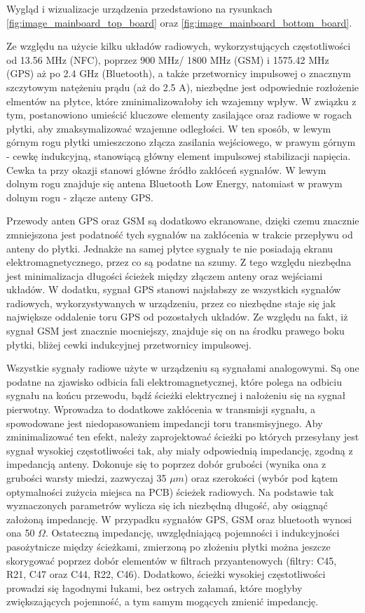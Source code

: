 Wygląd i wizualizacje urządzenia przedstawiono na rysunkach \ref{fig:image_mainboard_top_board} oraz \ref{fig:image_mainboard_bottom_board}.

Ze względu na użycie kilku układów radiowych, wykorzystujących częstotliwości od 13.56 MHz (NFC), poprzez 900 MHz/ 1800 MHz (GSM) i 1575.42 MHz (GPS) aż po 2.4 GHz (Bluetooth), a także przetwornicy impulsowej o znacznym szczytowym natężeniu prądu (aż do 2.5 A), niezbędne jest odpowiednie rozłożenie elmentów na płytce, które zminimalizowałoby ich wzajemny wpływ. W związku z tym, postanowiono umieścić kluczowe elementy zasilające oraz radiowe w rogach płytki, aby zmaksymalizować wzajemne odległości. W ten sposób, w lewym górnym rogu płytki umieszczono złącza zasilania wejściowego, w prawym górnym - cewkę indukcyjną, stanowiącą główny element impulsowej stabilizacji napięcia. Cewka ta przy okazji stanowi główne źródło zakłóceń sygnałów. W lewym dolnym rogu znajduje się antena Bluetooth Low Energy, natomiast w prawym dolnym rogu - złącze anteny GPS. 

Przewody anten GPS oraz GSM są dodatkowo ekranowane, dzięki czemu znacznie zmniejszona jest podatność tych sygnałów na zakłócenia w trakcie przepływu od anteny do płytki. Jednakże na samej płytce sygnały te nie posiadają ekranu elektromagnetycznego, przez co są podatne na szumy. Z tego względu niezbędna jest minimalizacja długości ścieżek między złączem anteny oraz wejściami układów. W dodatku, sygnał GPS stanowi najsłabszy ze wszystkich sygnałów radiowych, wykorzystywanych w urządzeniu, przez co niezbędne staje się  jak największe oddalenie toru GPS od pozostałych układów. Ze względu na fakt, iż sygnał GSM jest znacznie mocniejszy, znajduje się on na środku prawego boku płytki, bliżej cewki indukcyjnej przetwornicy impulsowej. 

Wszystkie sygnały radiowe użyte w urządzeniu są sygnałami analogowymi. Są one podatne na zjawisko odbicia fali elektromagnetycznej, które polega na odbiciu sygnału na końcu przewodu, bądź ścieżki elektrycznej i nałożeniu się na sygnał pierwotny. Wprowadza to dodatkowe zakłócenia w transmisji sygnału, a spowodowane jest niedopasowaniem impedancji toru transmisyjnego. Aby zminimalizować ten efekt, należy zaprojektować ścieżki po których przesyłany jest sygnał wysokiej częstotliwości tak, aby miały odpowiednią impedancję, zgodną z impedancją anteny. Dokonuje się to poprzez dobór grubości (wynika ona z grubości warsty miedzi, zazwyczaj 35 $\mu m$) oraz szerokości (wybór pod kątem optymalności zużycia miejsca na PCB) ścieżek radiowych. Na podstawie tak wyznaczonych parametrów wylicza się ich niezbędną długość, aby osiągnąć założoną impedancję. W przypadku sygnałów GPS, GSM oraz bluetooth wynosi ona 50 $\Omega$. Ostateczną impedancję, uwzględniającą pojemności i indukcyjności pasożytnicze między ścieżkami, zmierzoną po złożeniu płytki można jeszcze skorygować poprzez dobór elementów w filtrach przyantenowych (filtry: C45, R21, C47 oraz C44, R22, C46). Dodatkowo, ścieżki wysokiej częstotliwości prowadzi się łagodnymi łukami, bez ostrych załamań, które mogłyby zwiększających pojemność, a tym samym mogących zmienić impedancję. 

